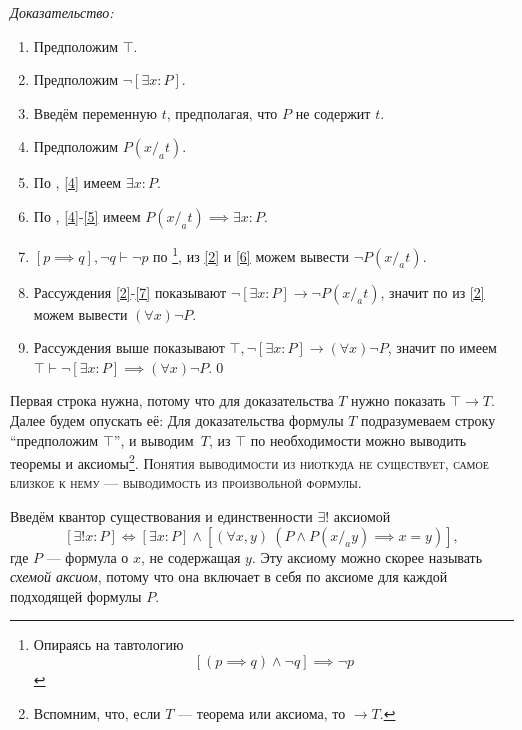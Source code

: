 {\it Доказательство:}
\begin{enumerate}[label=(\arabic*)]
	\item{}\label{1}Предположим $\top$.
	\item{}\label{2}Предположим $\lnot [\exists x:P]$.
	\item{}\label{3}Введём переменную $t$, предполагая, что $P$ не содержит $t$.
	\item{}\label{4}Предположим $P(x/_{a}t)$.
	\item{}\label{5}По \Eii{}, \ref{4} имеем $\exists x:P$.
	\item{}\label{6}По \implic{}, \ref{4}-\ref{5} имеем
	$P(x/_{a}t)\implies \exists x:P$.
	\item{}\label{7}${[p\implies q],\lnot q\vdash \lnot p}$ по \taut{}\footnote{
		Опираясь на тавтологию
		\[
			[(p\implies q)\land\lnot q]\implies\lnot p
		\]
	}, из
	\ref{2} и \ref{6} можем вывести $\lnot P(x/_{a}t)$.
	\item{}\label{8}Рассуждения \ref{2}-\ref{7} показывают
	$\lnot[\exists x:P]\to\lnot P(x/_{a}t)$, значит по \Aii{} из \ref{2} можем
	вывести $(\forall x)\lnot P$.
	\item{}\label{9}Рассуждения выше показывают
	$\top,\lnot[\exists x:P]\to (\forall x)\lnot P$, значит по \implic{}
	имеем $\top\vdash \lnot [\exists x:P]\implies  (\forall x)\lnot P$.\qed
\end{enumerate}

Первая строка нужна, потому что для доказательства $T$ нужно показать $\top\to T$.
Далее будем опускать её:
Для доказательства формулы $T$ подразумеваем строку ``предположим $\top$'',
и выводим~$T$, из $\top$ по необходимости можно выводить теоремы и аксиомы\footnote{
	Вспомним, что, если $T$ --- теорема или аксиома, то $\to T$.
}.
\textsc{Понятия выводимости из ниоткуда не существует,
	самое близкое к нему --- выводимость из произвольной формулы.}

Введём квантор существования и единственности $\exists !$ аксиомой
\[
	[\exists! x:P]\iff [\exists x:P]\land[(\forall x,y)~(P\land P(x/_{a}y)\implies x=y)],
\]
где $P$ --- формула о $x$, не содержащая $y$. Эту аксиому можно скорее называть
{\it схемой аксиом}, потому что она включает в себя по аксиоме для
каждой подходящей формулы $P$.

